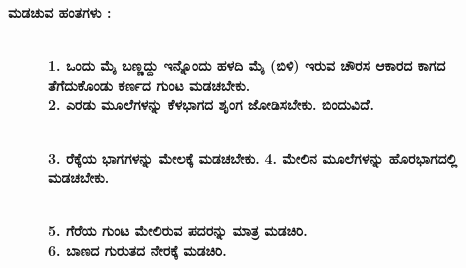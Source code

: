 \noindent
\textbf{ಮಡಚುವ ಹಂತಗಳು :}
\begin{figure}[H]
\\
\textbf{1. ಒಂದು ಮೈ ಬಣ್ಣದ್ದು ಇನ್ನೊಂದು ಹಳದಿ ಮೈ (ಬಿಳಿ) ಇರುವ ಚೌರಸ ಆಕಾರದ ಕಾಗದ ತೆಗೆದುಕೊಂಡು ಕರ್ಣದ ಗುಂಟ ಮಡಚಬೇಕು.}\\
\textbf{2. ಎರಡು ಮೂಲೆಗಳನ್ನು ಕೆಳಭಾಗದ ಶೃಂಗ ಜೋಡಿಸಬೇಕು. ಬಿಂದುವಿದೆ.}
\end{figure}
\begin{figure}[H]
\\
\textbf{3. ರೆಕ್ಕೆಯ ಭಾಗಗಳನ್ನು ಮೇಲಕ್ಕೆ ಮಡಚಬೇಕು.}
\textbf{4. ಮೇಲಿನ ಮೂಲೆಗಳನ್ನು ಹೊರಭಾಗದಲ್ಲಿ ಮಡಚಬೇಕು.}
\end{figure}
\begin{figure}[H]
\\
\textbf{5. ಗೆರೆಯ ಗುಂಟ ಮೇಲಿರುವ ಪದರನ್ನು ಮಾತ್ರ ಮಡಚಿರಿ.}\\
\textbf{6. ಬಾಣದ ಗುರುತದ ನೇರಕ್ಕೆ ಮಡಚಿರಿ.}
\end{figure}
